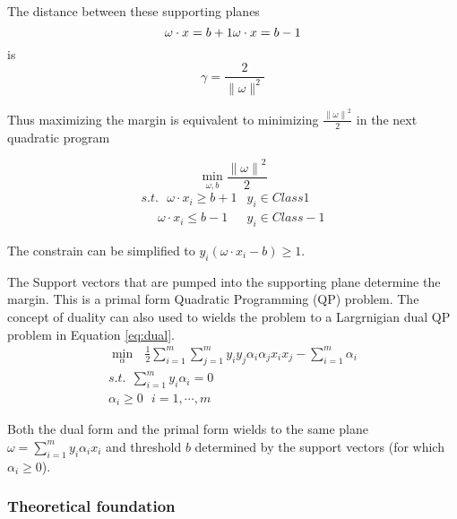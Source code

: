The distance between these supporting planes 
\begin{equation}
 \omega \cdot x=b+1 \\
  \omega \cdot x=b-1
\end{equation}
is 
\begin{equation}
 \gamma = \frac{2}{\parallel \omega \parallel^2}
\end{equation}

Thus maximizing the margin is equivalent to minimizing $\frac{{\parallel \omega \parallel}^2}{2}$ in the next quadratic program 

\begin{equation}
 \min_{\omega,b}  \frac{{\parallel \omega \parallel}^2}{2}
\end{equation}
\begin{equation}	
\begin{array}{cc}
 s.t. \ \ \   \omega \cdot x_i \geq b+1 &    y_i \in Class 1 \\ 
 \ \ \ \ \ \   \omega \cdot x_i \leq b-1 &    y_i \in Class -1 
  \end{array} 
\end{equation}

The constrain can be simplified to $y_i(\omega \cdot x_i-b)\geq 1$. 

The Support vectors that are pumped into the supporting plane determine the margin. This is a primal form Quadratic Programming (QP) problem. The concept of duality can also used to wields the problem to a Largrnigian dual QP problem in Equation \ref{eq:dual}. 
\begin{equation}
\begin{array}{c}
\min_{\alpha} \ \ \   \frac{1}{2} \sum_{i=1}^{m}{\sum_{j=1}^{m}{y_iy_j\alpha_i\alpha_jx_ix_j}} - \sum_{i=1}^{m}{\alpha_i} \\
s.t. \ \ \sum_{i=1}^{m}{y_i\alpha_i}=0   \\
  \alpha_i \geq 0  \ \ \ i=1,\cdots , m 
  \end{array} 
\label{eq:dual}
\end{equation}

Both the dual form and the primal form wields to the same plane $\omega=\sum_{i=1}^{m}y_i\alpha_i x_i$ and threshold $b$ determined by the support vectors (for which $\alpha_i\geq 0$). 

\subsubsection{Theoretical foundation}


